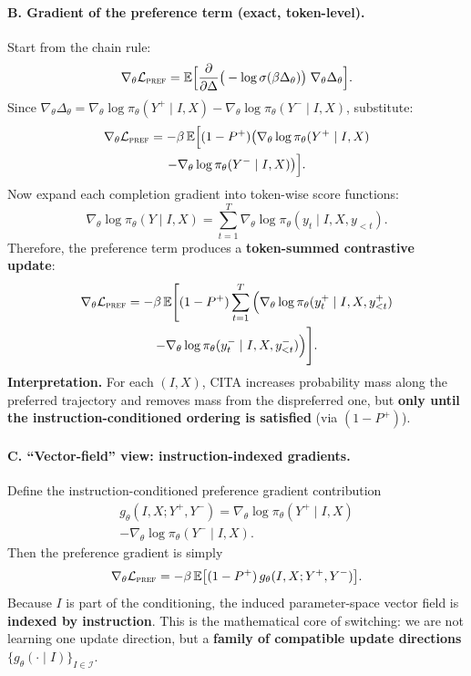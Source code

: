\paragraph{\textbf{B. Gradient of the preference term (exact, token-level).}}
Start from the chain rule:
\[
\nabla_\theta \mathcal{L}_{\textsc{pref}}
=
\mathbb{E}
\Big[
\frac{\partial}{\partial \Delta}\big(-\log \sigma(\beta\Delta_\theta)\big)\;
\nabla_\theta \Delta_\theta
\Big].
\]
Since $\nabla_\theta \Delta_\theta=\nabla_\theta\log\pi_\theta(Y^+\mid I,X)-\nabla_\theta\log\pi_\theta(Y^-\mid I,X)$, substitute:
{\small
\begin{multline*}
\nabla_\theta \mathcal{L}_{\textsc{pref}}
=
-\beta\,
\mathbb{E}
\Big[
(1-P^+)\big(
\nabla_\theta\log\pi_\theta(Y^+\mid I,X)\\
-\nabla_\theta\log\pi_\theta(Y^-\mid I,X)
\big)
\Big].
\end{multline*}
}
Now expand each completion gradient into token-wise score functions:
{\small
\[
\nabla_\theta\log\pi_\theta(Y\mid I,X)
=
\sum_{t=1}^{T}
\nabla_\theta\log\pi_\theta(y_t\mid I,X,y_{<t}).
\]
}
Therefore, the preference term produces a \textbf{token-summed contrastive update}:
{\small
\begin{multline*}
\nabla_\theta \mathcal{L}_{\textsc{pref}}
=
-\beta\,
\mathbb{E}
\Bigg[
(1-P^+)\sum_{t=1}^{T}
\Big(
\nabla_\theta\log\pi_\theta(y^+_t\mid I,X,y^+_{<t})
\\
-
\nabla_\theta\log\pi_\theta(y^-_t\mid I,X,y^-_{<t})
\Big)
\Bigg].
\end{multline*}
}
\textbf{Interpretation.} For each $(I,X)$, CITA increases probability mass along the preferred trajectory and removes mass from the dispreferred one, but \textbf{only until the instruction-conditioned ordering is satisfied} (via $(1-P^+)$).

\vspace{-0.35em}
\paragraph{\textbf{C. ``Vector-field'' view: instruction-indexed gradients.}}
Define the instruction-conditioned preference gradient contribution
\begin{multline*}
g_\theta(I,X;Y^+,Y^-)
=
\nabla_\theta\log\pi_\theta(Y^+\mid I,X)\\
-\nabla_\theta\log\pi_\theta(Y^-\mid I,X).
\end{multline*}
Then the preference gradient is simply
\[
\nabla_\theta \mathcal{L}_{\textsc{pref}}
=
-\beta\,\mathbb{E}\big[(1-P^+)\,g_\theta(I,X;Y^+,Y^-)\big].
\]
Because $I$ is part of the conditioning, the induced parameter-space vector field is \textbf{indexed by instruction}.
This is the mathematical core of switching: we are not learning one update direction, but a \textbf{family of compatible update directions} $\{g_\theta(\cdot\mid I)\}_{I\in\mathcal{I}}$.

